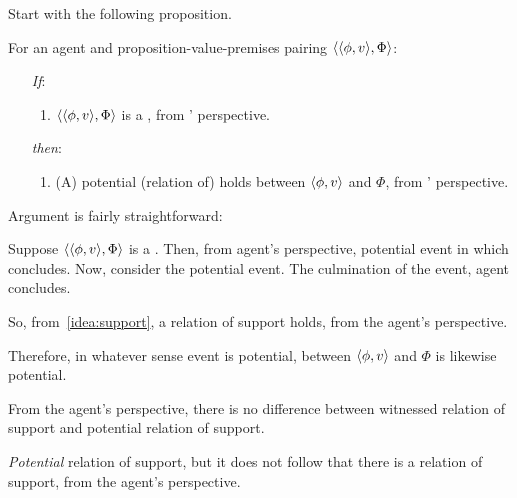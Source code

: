 \begin{note}
  Start with the following proposition.
  \begin{proposition}
    \label{prop:fcs-only-if-pot-support}
    For an agent \vAgent{} and proposition-value-premises pairing \(\langle \langle \phi, v \rangle, \Phi \rangle\):
    \begin{enumerate}
    \item[\emph{If}:]
      \begin{enumerate}[label=\alph*., ref=(\alph*.)]
      \item
        \(\langle \langle \phi, v \rangle, \Phi \rangle\) is a , from \vAgent{}' perspective.
      \end{enumerate}
    \item[\emph{then}:]
      \begin{enumerate}[label=\alph*., ref=(\alph*.), resume]
      \item
        (A) potential (relation of) \support{} holds between \(\langle \phi, v \rangle\) and \(\Phi\), from \vAgent{}' perspective.
      \end{enumerate}
    \end{enumerate}
    \vspace{-\baselineskip}
  \end{proposition}

  Argument is fairly straightforward:
  \begin{argument}
    Suppose \(\langle \langle \phi, v \rangle, \Phi \rangle\) is a .
    Then, from agent's perspective, potential event in which concludes.
    Now, consider the potential event.
    The culmination of the event, agent concludes.

    So, from~\autoref{idea:support}, a relation of support holds, from the agent's perspective.

    Therefore, in whatever sense event is potential, \support{} between \(\langle \phi, v \rangle\) and \(\Phi\) is likewise potential.
  \end{argument}
  From the agent's perspective, there is no difference between witnessed relation of support and potential relation of support.
\end{note}

\begin{note}
  \emph{Potential} relation of support, but it does not follow that there is a relation of support, from the agent's perspective.
\end{note}

